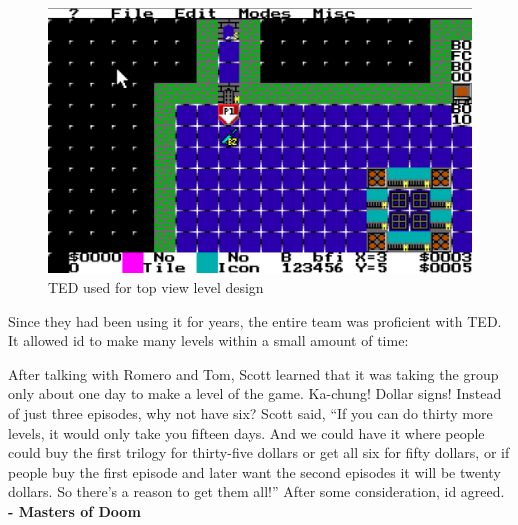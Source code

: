 \documentclass[book.tex]{subfiles}
\begin{document}
\begin{figure}[H]
\centering
 \includegraphics[width=\textwidth]{imgs/TED.png}
 \caption{TED used for top view level design} \label{fig:mips}
 \end{figure}

Since they had been using it for years, the entire team was proficient with TED. It allowed id to make many levels within a small amount of time:

 \begin{fancyquotes}
After talking with Romero and Tom, Scott learned that it was taking the group only about one day to make a level of the game. Ka-chung! Dollar signs! Instead of just three episodes, why not have six? Scott said, “If you can do thirty more levels, it would only take you fifteen days. And we could have it where people could buy the first trilogy for thirty-five dollars or get all six for fifty dollars, or if people buy the first episode and later want the second episodes it will be twenty dollars. So there’s a reason to get them all!” After some consideration, id agreed.
 \textbf{- Masters of Doom}
 \end{fancyquotes}\\
\end{document}
